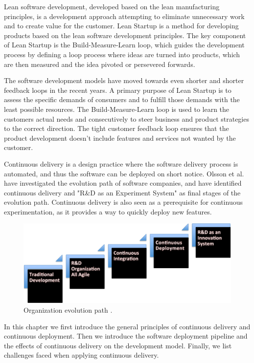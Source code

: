 \documentclass[english]{tktltiki2}
\theoremstyle{definition}
\theoremstyle{remark}
\begin{document}
Lean software development, developed based on the lean manufacturing principles, is a development approach attempting to eliminate unnecessary work and to create value for the customer. Lean Startup \cite{ries2011lean} is a method for developing products based on the lean software development principles. The key component of Lean Startup is the Build-Measure-Learn loop, which guides the development process by defining a loop process where ideas are turned into products, which are then measured and the idea pivoted or persevered forwards.

The software development models have moved towards even shorter and shorter feedback loops in the recent years. A primary purpose of Lean Startup is to assess the specific demands of consumers and to fulfill those demands with the least possible resources. The Build-Measure-Learn loop is used to learn the customers actual needs and consecutively to steer business and product strategies to the correct direction. The tight customer feedback loop ensures that the product development doesn't include features and services not wanted by the customer. 

Continuous delivery is a design practice where the software delivery process is automated, and thus the software can be deployed on short notice. Olsson et al. have investigated the evolution path of software companies, and have identified continuous delivery and "R\&D as an Experiment System" as final stages \cite{olsson2012climbing} of the evolution path. Continuous delivery is also seen as a prerequisite for continuous experimentation, as it provides a way to quickly deploy new features. 

\begin{figure}[h]
	\centering
	\includegraphics[width=5.0in]{stairway.png}
	\caption{Organization evolution path \cite{olsson2012climbing}.}
\end{figure}

In this chapter we first introduce the general principles of continuous delivery and continuous deployment. Then we introduce the software deployment pipeline and the effects of continuous delivery on the development model. Finally, we list challenges faced when applying continuous delivery.
\end{document}
